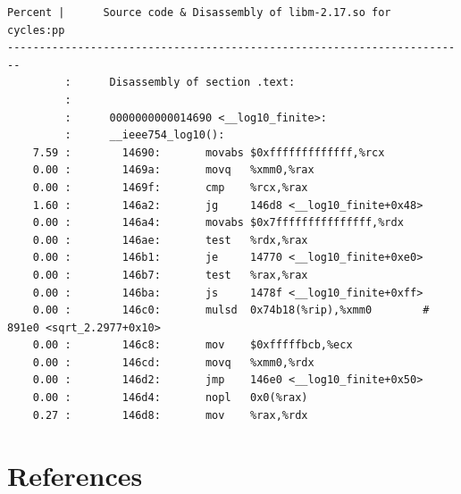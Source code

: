 \documentclass[a4paper]{jpconf}
\begin{document}
\begin{appendices}
\begin{minipage}{\linewidth}
\begin{lstlisting}[language={[x64]Assembler}, basicstyle=\ttfamily\tiny,
caption=\_\_log10\_finite cycles annotation, label=lst:log10]
Percent |      Source code & Disassembly of libm-2.17.so for  cycles:pp
------------------------------------------------------------------------
         :      Disassembly of section .text:
         :
         :      0000000000014690 <__log10_finite>:
         :      __ieee754_log10():
    7.59 :        14690:       movabs $0xfffffffffffff,%rcx
    0.00 :        1469a:       movq   %xmm0,%rax
    0.00 :        1469f:       cmp    %rcx,%rax
    1.60 :        146a2:       jg     146d8 <__log10_finite+0x48>
    0.00 :        146a4:       movabs $0x7fffffffffffffff,%rdx
    0.00 :        146ae:       test   %rdx,%rax
    0.00 :        146b1:       je     14770 <__log10_finite+0xe0>
    0.00 :        146b7:       test   %rax,%rax
    0.00 :        146ba:       js     1478f <__log10_finite+0xff>
    0.00 :        146c0:       mulsd  0x74b18(%rip),%xmm0        # 891e0 <sqrt_2.2977+0x10>
    0.00 :        146c8:       mov    $0xfffffbcb,%ecx
    0.00 :        146cd:       movq   %xmm0,%rdx
    0.00 :        146d2:       jmp    146e0 <__log10_finite+0x50>
    0.00 :        146d4:       nopl   0x0(%rax)
    0.27 :        146d8:       mov    %rax,%rdx
\end{lstlisting}
\end{minipage}


\end{appendices}
\section*{References}


\end{document}
